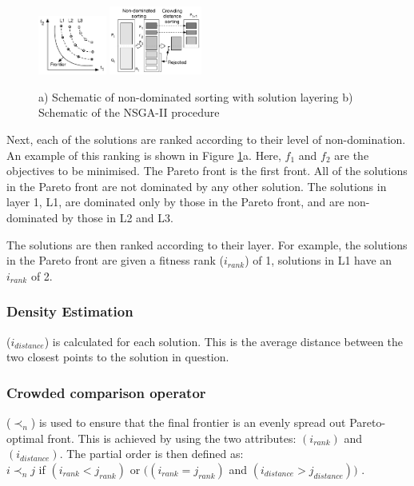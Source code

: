\documentclass[sigconf]{acmart}
\begin{document}
\begin{figure}[t] 
  \vskip -10pt
  \center
  \includegraphics[width=0.2\textwidth]{figures/carbon_optimiser/paretofrontier/paretofrontier}
  \includegraphics[width=0.270\textwidth]{figures/carbon_optimiser/algsketch/sketch2}
  \vskip -8pt
  \caption{a) Schematic of non-dominated sorting with solution layering b) Schematic of the NSGA-II procedure}
  \label{fig:pareto-layering}
  \vskip -15pt
\end{figure}


Next, each of the solutions are ranked according to their level of non-domination. An example of this ranking is shown in Figure \ref{fig:pareto-layering}a. Here, $f_1$ and $f_2$ are the objectives to be minimised. The Pareto front is the first front. All of the solutions in the Pareto front are not dominated by any other solution. The solutions in layer 1, L1, are dominated only by those in the Pareto front, and are non-dominated by those in L2 and L3.

The solutions are then ranked according to their layer. For example, the solutions in the Pareto front are given a fitness rank ($i_{rank}$) of 1, solutions in L1 have an $i_{rank}$ of 2.

\subsubsection{Density Estimation}
($i_{distance}$) is calculated for each solution. This is the average distance between the two closest points to the solution in question. 


\subsubsection{Crowded comparison operator}
($\prec_n$) is used to ensure that the final frontier is an evenly spread out Pareto-optimal front. This is achieved by using the two attributes: $(i_{rank})$ and$(i_{distance})$. 
The partial order is then defined as:\\	
$i\prec_nj$ if $(i_{rank}<j_{rank})$ or $((i_{rank}=j_{rank})$ and  $(i_{distance}>j_{distance}))$ \cite{Valkanas2014}.
\end{document}
